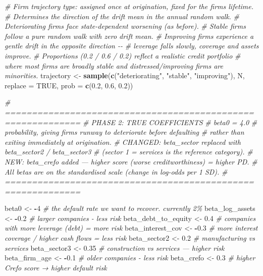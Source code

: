 \documentclass[
]{article}
\newenvironment{Shaded}{\begin{snugshade}}{\end{snugshade}}
\newcommand{\AttributeTok}[1]{\textcolor[rgb]{0.13,0.29,0.53}{#1}}
\newcommand{\CommentTok}[1]{\textcolor[rgb]{0.56,0.35,0.01}{\textit{#1}}}
\newcommand{\ConstantTok}[1]{\textcolor[rgb]{0.56,0.35,0.01}{#1}}
\newcommand{\DecValTok}[1]{\textcolor[rgb]{0.00,0.00,0.81}{#1}}
\newcommand{\FloatTok}[1]{\textcolor[rgb]{0.00,0.00,0.81}{#1}}
\newcommand{\FunctionTok}[1]{\textcolor[rgb]{0.13,0.29,0.53}{\textbf{#1}}}
\newcommand{\NormalTok}[1]{#1}
\newcommand{\OtherTok}[1]{\textcolor[rgb]{0.56,0.35,0.01}{#1}}
\newcommand{\SpecialCharTok}[1]{\textcolor[rgb]{0.81,0.36,0.00}{\textbf{#1}}}
\newcommand{\StringTok}[1]{\textcolor[rgb]{0.31,0.60,0.02}{#1}}
\begin{document}
\begin{Shaded}
\begin{Highlighting}[]
  \CommentTok{\# Firm trajectory type: assigned once at origination, fixed for the firm\textquotesingle{}s lifetime.}
  \CommentTok{\# Determines the direction of the drift mean in the annual random walk.}
  \CommentTok{\# Deteriorating firms face state{-}dependent worsening (as before).}
  \CommentTok{\# Stable firms follow a pure random walk with zero drift mean.}
  \CommentTok{\# Improving firms experience a gentle drift in the opposite direction {-}{-}}
  \CommentTok{\# leverage falls slowly, coverage and assets improve.}
  \CommentTok{\# Proportions (0.2 / 0.6 / 0.2) reflect a realistic credit portfolio}
  \CommentTok{\# where most firms are broadly stable and distressed/improving firms are minorities.}
\NormalTok{  trajectory }\OtherTok{\textless{}{-}} \FunctionTok{sample}\NormalTok{(}\FunctionTok{c}\NormalTok{(}\StringTok{"deteriorating"}\NormalTok{, }\StringTok{"stable"}\NormalTok{, }\StringTok{"improving"}\NormalTok{),}
\NormalTok{                       N, }\AttributeTok{replace =} \ConstantTok{TRUE}\NormalTok{, }\AttributeTok{prob =} \FunctionTok{c}\NormalTok{(}\FloatTok{0.2}\NormalTok{, }\FloatTok{0.6}\NormalTok{, }\FloatTok{0.2}\NormalTok{))}
  
  \CommentTok{\# ============================================================}
  \CommentTok{\# PHASE 2: TRUE COEFFICIENTS}
  \CommentTok{\# beta0 = 4.0 }
  \CommentTok{\# probability, giving firms runway to deteriorate before defaulting}
  \CommentTok{\# rather than exiting immediately at origination.}
  \CommentTok{\# CHANGED: beta\_sector replaced with beta\_sector2 / beta\_sector3}
  \CommentTok{\# (sector 1 = services is the reference category).}
  \CommentTok{\# NEW: beta\_crefo added — higher score (worse creditworthiness) = higher PD.}
  \CommentTok{\# All betas are on the standardised scale (change in log{-}odds per 1 SD).}
  \CommentTok{\# ============================================================}
  
\NormalTok{  beta0               }\OtherTok{\textless{}{-}} \SpecialCharTok{{-}}\DecValTok{4}     \CommentTok{\# the default rate we want to recover. currently 2\%}
\NormalTok{  beta\_log\_assets     }\OtherTok{\textless{}{-}} \SpecialCharTok{{-}}\FloatTok{0.2}   \CommentTok{\# larger companies {-} less risk}
\NormalTok{  beta\_debt\_to\_equity }\OtherTok{\textless{}{-}}  \FloatTok{0.4}   \CommentTok{\# companies with more leverage (debt) = more risk}
\NormalTok{  beta\_interest\_cov   }\OtherTok{\textless{}{-}} \SpecialCharTok{{-}}\FloatTok{0.3}   \CommentTok{\# more interest coverage / higher cash flows = less risk}
\NormalTok{  beta\_sector2        }\OtherTok{\textless{}{-}}  \FloatTok{0.2}   \CommentTok{\# manufacturing vs services}
\NormalTok{  beta\_sector3        }\OtherTok{\textless{}{-}}  \FloatTok{0.35}  \CommentTok{\# construction vs services — higher risk}
\NormalTok{  beta\_firm\_age       }\OtherTok{\textless{}{-}} \SpecialCharTok{{-}}\FloatTok{0.1}   \CommentTok{\# older companies {-} less risk}
\NormalTok{  beta\_crefo          }\OtherTok{\textless{}{-}}  \FloatTok{0.3}   \CommentTok{\# higher Crefo score → higher default risk}
  

\end{Highlighting}
\end{Shaded}
\end{document}
